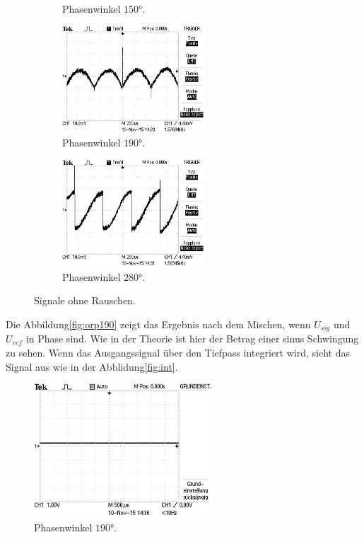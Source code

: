 \begin{figure}
\begin{subfigure}{0.48\textwidth}
\caption{Phasenwinkel $150°$.}
\label{fig:orp150}
\end{subfigure}
\begin{subfigure}{0.48\textwidth}
\centering
\includegraphics[height=4cm]{Bilder/or/or190.JPG}
\caption{Phasenwinkel $190°$.}
\label{fig:orp190}
\end{subfigure}
\begin{subfigure}{0.48\textwidth}
\centering
\includegraphics[height=4cm]{Bilder/or/or280.JPG}
\caption{Phasenwinkel $280°$.}
\label{fig:orp280}
\end{subfigure}
\caption{Signale ohne Rauschen.}
\label{fig:Signale ohne Rauschen}
\end{figure}
Die Abbildung\eqref{fig:orp190} zeigt das Ergebnis nach dem Mischen, wenn $U_{sig}$
und $U_{ref}$ in Phase sind. Wie in der Theorie ist hier der Betrag einer sinus
Schwingung zu sehen.
Wenn das Ausgangssignal über den Tiefpass integriert wird, sieht das
Signal aus wie in der Abblidung\eqref{fig:int}.
\begin{figure}
  \centering
  \includegraphics[height=5cm]{Bilder/int/INT.JPG}
  \caption{Phasenwinkel $190°$.}
  \label{fig:int}
\end{figure}
